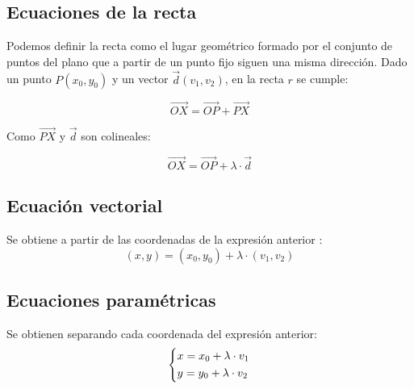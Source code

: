 \documentclass[a4paper,spanish,9pt]{extarticle}
\begin{document}
\begin{multicols*}{2}
\section{Ecuaciones de la recta}

Podemos definir la recta como el lugar geométrico formado por el conjunto de puntos del plano que a partir de un punto fijo siguen una misma dirección. Dado un punto $P(x_0,y_0)$ y un vector $\overrightarrow{d}(v_1,v_2)$, en la recta $r$ se cumple:


$$\overrightarrow{OX}=\overrightarrow{OP}+\overrightarrow{PX} $$ 

Como $\overrightarrow{PX}$ y $\overrightarrow{d}$ son colineales:

$$\overrightarrow{OX}=\overrightarrow{OP}+\lambda\cdot\overrightarrow{d} $$ 

\subsection{Ecuación vectorial}
Se obtiene a partir de las coordenadas de la expresión anterior :
$$(x,y)=(x_0,y_0)+\lambda\cdot(v_1,v_2)$$

\subsection{Ecuaciones paramétricas}
Se obtienen separando cada coordenada del expresión anterior:
$$\left\lbrace \begin{gathered}
  x = x_0 + \lambda\cdot v_1 \hfill \\
  y = y_0 + \lambda\cdot v_2 \hfill \\ 
\end{gathered}  \right.
$$
 

\end{multicols*}
\end{document}

